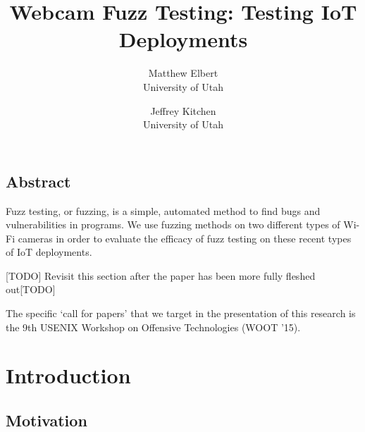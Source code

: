 \documentclass[letterpaper,twocolumn,10pt]{article}
\begin{document}
\date{}

\title{\Large \bf Webcam Fuzz Testing: Testing IoT Deployments}

\author{
{\rm Matthew Elbert}\\
University of Utah
\and
{\rm Jeffrey Kitchen}\\
University of Utah
} %

\maketitle

\thispagestyle{empty}


\subsection*{Abstract}
Fuzz testing, or fuzzing, is a simple, automated method to find bugs and vulnerabilities in programs.  
We use fuzzing methods on two different types of Wi-Fi cameras in order to evaluate the efficacy of fuzz testing on these recent types of IoT deployments.

[TODO] Revisit this section after the paper has been more fully fleshed out[TODO]

The specific `call for papers' that we target in the presentation of this research is the 9th USENIX Workshop on Offensive Technologies (WOOT '15). 

\section{Introduction}
\subsection{Motivation}
\end{document}

